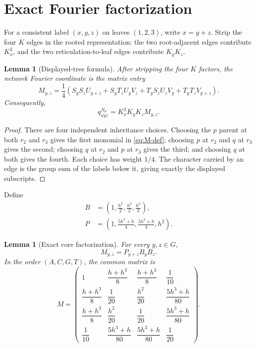 \documentclass[11pt]{article}
\newtheorem{lemma}[theorem]{Lemma}
\theoremstyle{remark}
\begin{document}
\section{Exact Fourier factorization}

For a consistent label $(x,y,z)$ on leaves $(1,2,3)$, write $x=y+z$.  Strip the four $K$ edges in the rooted representation: the two root-adjacent edges contribute $K_x^2$, and the two reticulation-to-leaf edges contribute $K_yK_z$.

\begin{lemma}[Displayed-tree formula]\label{lem:display-formula}
After stripping the four $K$ factors, the network Fourier coordinate is the matrix entry
\begin{equation}\label{eq:M-def}
 M_{y,z}=\frac14\left(
 S_yS_zU_{y+z}
 +S_yT_zU_yV_z
 +T_yS_zU_zV_y
 +T_yT_zV_{y+z}
 \right).
\end{equation}
Consequently,
\begin{equation}\label{eq:q-network-M}
  q^{N_\theta}_{xyz}=K_x^2K_yK_zM_{y,z}.
\end{equation}
\end{lemma}

\begin{proof}
There are four independent inheritance choices.  Choosing the $p$ parent at both $r_2$ and $r_3$ gives the first monomial in \eqref{eq:M-def}; choosing $p$ at $r_2$ and $q$ at $r_3$ gives the second; choosing $q$ at $r_2$ and $p$ at $r_3$ gives the third; and choosing $q$ at both gives the fourth.  Each choice has weight $1/4$.  The character carried by an edge is the group sum of the labels below it, giving exactly the displayed subscripts.
\end{proof}

Define
\begin{equation}\label{eq:PB}
\begin{aligned}
 B&=\left(1,\frac{h^2}{2},\frac{h^2}{2},\frac{h^2}{2}\right),\\
 P&=\left(1,\frac{5h^3+h}{4},\frac{5h^3+h}{4},h^2\right).
\end{aligned}
\end{equation}

\begin{lemma}[Exact core factorization]\label{lem:factorization}
For every $y,z\in G$,
\begin{equation}\label{eq:factorization}
  M_{y,z}=P_{y+z}B_yB_z.
\end{equation}
In the order $(A,C,G,T)$, the common matrix is
\begin{equation}\label{eq:M-matrix}
M=\begin{pmatrix}
1 & \dfrac{h+h^3}{8} & \dfrac{h+h^3}{8} & \dfrac1{10}\\[2mm]
\dfrac{h+h^3}{8} & \dfrac1{20} & \dfrac{h^2}{20} & \dfrac{5h^3+h}{80}\\[2mm]
\dfrac{h+h^3}{8} & \dfrac{h^2}{20} & \dfrac1{20} & \dfrac{5h^3+h}{80}\\[2mm]
\dfrac1{10} & \dfrac{5h^3+h}{80} & \dfrac{5h^3+h}{80} & \dfrac1{20}
\end{pmatrix}.
\end{equation}
\end{lemma}
\end{document}
